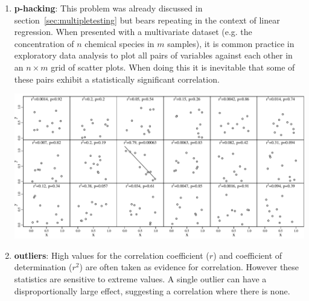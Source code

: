 \begin{enumerate}
\item{\bf p-hacking}: This problem was already discussed in
  section~\ref{sec:multipletesting} but bears repeating in the context
  of linear regression. When presented with a multivariate dataset
  (e.g. the concentration of $n$ chemical species in $m$ samples), it
  is common practice in exploratory data analysis to plot all pairs of
  variables against each other in an $n\times{m}$ grid of scatter
  plots. When doing this it is inevitable that some of these pairs
  exhibit a statistically significant correlation.

\noindent\begin{minipage}[t][][b]{\linewidth}
  \includegraphics[width=\textwidth]{../figures/regression-p-hacking.pdf}
  \label{fig:regression-p-hacking}
\end{minipage}

\item{\bf outliers}: High values for the correlation coefficient ($r$)
  and coefficient of determination ($r^2$) are often taken as evidence
  for correlation. However these statistics are sensitive to extreme
  values.  A single outlier can have a disproportionally large effect,
  suggesting a correlation where there is none.


\end{enumerate}
